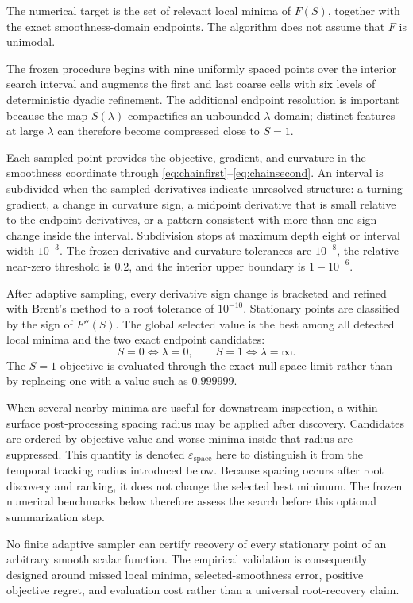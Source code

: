 \documentclass[english]{smcca}
\begin{document}
The numerical target is the set of relevant local minima of \(F(S)\), together with the exact smoothness-domain endpoints. The algorithm does not assume that \(F\) is unimodal.

The frozen procedure begins with nine uniformly spaced points over the interior search interval and augments the first and last coarse cells with six levels of deterministic dyadic refinement. The additional endpoint resolution is important because the map \(S(\lambda)\) compactifies an unbounded \(\lambda\)-domain; distinct features at large \(\lambda\) can therefore become compressed close to \(S=1\).

Each sampled point provides the objective, gradient, and curvature in the smoothness coordinate through \eqref{eq:chainfirst}--\eqref{eq:chainsecond}. An interval is subdivided when the sampled derivatives indicate unresolved structure: a turning gradient, a change in curvature sign, a midpoint derivative that is small relative to the endpoint derivatives, or a pattern consistent with more than one sign change inside the interval. Subdivision stops at maximum depth eight or interval width \(10^{-3}\). The frozen derivative and curvature tolerances are \(10^{-8}\), the relative near-zero threshold is \(0.2\), and the interior upper boundary is \(1-10^{-6}\).

After adaptive sampling, every derivative sign change is bracketed and refined with Brent's method \cite{brent1971zero} to a root tolerance of \(10^{-10}\). Stationary points are classified by the sign of \(F''(S)\). The global selected value is the best among all detected local minima and the two exact endpoint candidates:
\[
S=0\Longleftrightarrow\lambda=0,
\qquad
S=1\Longleftrightarrow\lambda=\infty.
\]
The \(S=1\) objective is evaluated through the exact null-space limit rather than by replacing one with a value such as \(0.999999\).

When several nearby minima are useful for downstream inspection, a within-surface post-processing spacing radius may be applied after discovery. Candidates are ordered by objective value and worse minima inside that radius are suppressed. This quantity is denoted \(\varepsilon_{\mathrm{space}}\) here to distinguish it from the temporal tracking radius introduced below. Because spacing occurs after root discovery and ranking, it does not change the selected best minimum. The frozen numerical benchmarks below therefore assess the search before this optional summarization step.

No finite adaptive sampler can certify recovery of every stationary point of an arbitrary smooth scalar function. The empirical validation is consequently designed around missed local minima, selected-smoothness error, positive objective regret, and evaluation cost rather than a universal root-recovery claim.
\end{document}
